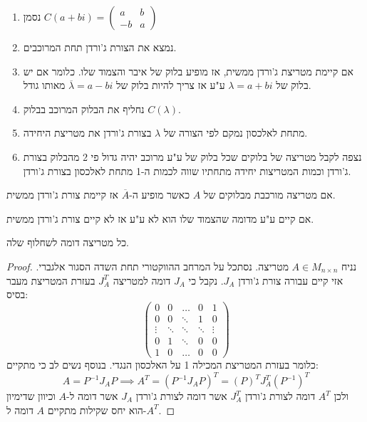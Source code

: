 \documentclass{tstextbook}
\begin{document}
\begin{proposition}
  \begin{enumerate}
    \item נסמן \(C(a+bi)=\begin{pmatrix} a & b \\ -b & a\end{pmatrix}\)


    \item נמצא את הצורת ג'ורדן תחת המרוכבים. 


    \item אם קיימת מטריצת ג'ורדן ממשית, אז מופיע בלוק של איבר והצמוד שלו. כלומר אם יש בלוק של \(\lambda=a+bi\) ע"ע אז צריך להיות בלוק של \(\overline{\lambda}=a-bi\) מאותו גודל. 


    \item נחליף את הבלוק המרוכב בבלוק \(C(\lambda)\). 


    \item מתחת לאלכסון נמקם לפי הצורה של \(\lambda\) בצורת ג'ורדן את מטריצת היחידה. 


    \item נצפה לקבל מטריצה של בלוקים שכל בלוק של ע"ע מרוכב יהיה גדול פי 2 מהבלוק בצורת ג'ורדן וכמות המטריצות יחידה מתחתיו שווה לכמות ה-1 מתחת לאלכסון בצורת ג'ורדן. 


  \end{enumerate}
\end{proposition}
\begin{proposition}
אם מטריצה מורכבת מבלוקים של \(A\) כאשר מופיע ה-\(\overline{A}\) אז קיימת צורת ג'ורדן ממשית.

\end{proposition}
\begin{proposition}
אם קיים ע"ע מדומה שהצמוד שלו הוא לא ע"ע אז לא קיים צורת ג'ורדן ממשית.

\end{proposition}
\begin{proposition}
כל מטריצה דומה לשחלוף שלה.

\end{proposition}
\begin{proof}
נניח \(A \in M_{n\times n}\) מטריצה. נסתכל על המרחב ההווקטורי תחת השדה הסגור אלגברי. אזי קיים עבורה צורת ג'ורדן \(J_{A}\). נקבל כי \(J_{A}\) דומה למטריצה \(J_{A}^{T}\) בעזרת המטריצת מעבר בסיס:
$$\begin{pmatrix}0 & 0 & \dots & 0 & 1\\0 & 0 & \ddots & 1 & 0\\\vdots & \ddots & \ddots & \ddots & \vdots\\0 & 1 & \ddots & 0 & 0\\1 & 0 & \dots & 0 & 0
\end{pmatrix}$$
כלומר בעזרת המטריצת המכילה 1 על האלכסון הנגדי. בנוסף נשים לב כי מתקיים:
$$A=P ^{-1} J_{A}P\implies A^{T}=\left( P ^{-1} J_{A} P \right)^{T}=(P)^{T}J_{A}^{T}(P ^{-1})^{T}$$
ולכן \(A^{T}\) דומה לצורת ג'ורדן \(J_{A}^{T}\) אשר דומה לצורת ג'ורדן \(J_{A}\) אשר דומה ל-\(A\) וכיוון שדימיון הוא יחס שקילות מתקיים \(A\) דומה ל-\(A^{T}\).

\end{proof}
\end{document}
